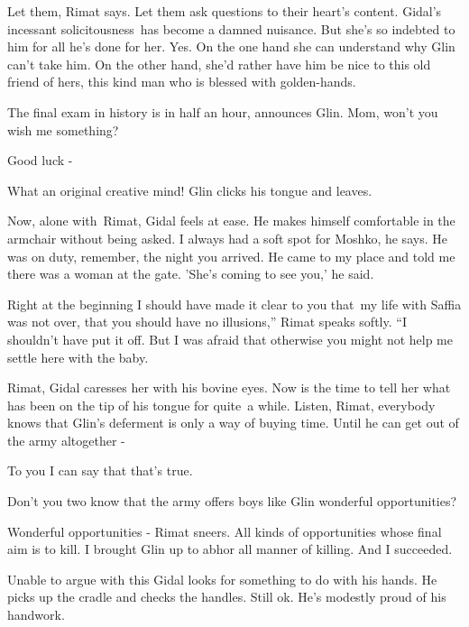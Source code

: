 \documentclass[twoside,11pt]{book}
\begin{document}
{\textquotedbl}Let them,{\textquotedbl} Rimat says. {\textquotedbl}Let them ask questions to their heart's
content.{\textquotedbl} Gidal's incessant solicitousness~has become a damned nuisance. But she's so indebted to him for
all he's done for her. Yes. On the one hand she can understand why Glin can't take him. On the other hand, she'd rather
have him be nice to this old friend of hers, this kind man who is blessed with golden-hands.

{\textquotedbl}The final exam in history is in half an hour,{\textquotedbl} announces Glin. {\textquotedbl}Mom, won't
you wish me something?{\textquotedbl} 

{\textquotedbl}Good luck -{\textquotedbl} 

{\textquotedbl}What an original creative mind!{\textquotedbl} Glin clicks his tongue and leaves.

Now, alone with~Rimat, Gidal feels at ease. He makes himself comfortable in the armchair without being asked.
{\textquotedbl}I always had a soft spot for Moshko,{\textquotedbl} he says. {\textquotedbl}He was on duty, remember,
the night you arrived. He came to my place and told me there was a woman at the gate. 'She's coming to see you,{}' he
said.{\textquotedbl} 

{\textquotedbl}Right at the beginning I should have made it clear to you that~my life with Saffia was not over, that you
should have no illusions,'' Rimat speaks softly. ``I shouldn't have put it off. But I was afraid that otherwise you
might not help me settle here with the baby.{\textquotedbl} 

{\textquotedbl}Rimat,{\textquotedbl} Gidal caresses her with his bovine eyes. Now is the time to tell her what has been
on the tip of his tongue for quite{\ }a while. {\textquotedbl}Listen, Rimat, everybody knows that Glin's
deferment is only a way of buying time. Until he can get out of the army altogether -{\textquotedbl} 

{\textquotedbl}To you I can say that that's true.{\textquotedbl} 

{\textquotedbl}Don't you two know that the army offers boys like Glin wonderful opportunities?{\textquotedbl} 

{\textquotedbl}Wonderful opportunities -{\textquotedbl} Rimat sneers. {\textquotedbl}All kinds of opportunities whose
final aim is to kill. I brought Glin up to abhor all manner of killing. And I succeeded.{\textquotedbl}

Unable to argue with this Gidal looks for something to do with his hands. He picks up the cradle and checks the handles.
Still ok. He's modestly proud of his handwork. 
\end{document}
